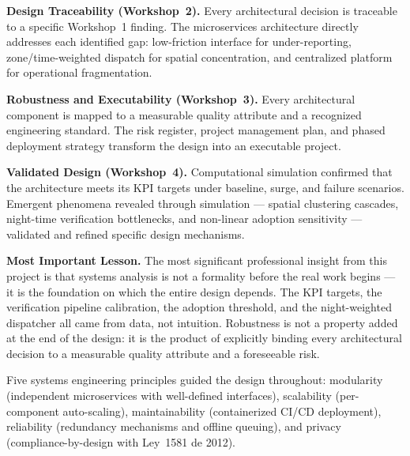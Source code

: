 \documentclass[11pt,a4paper]{article}
\begin{document}
\textbf{Design Traceability (Workshop~2).} Every architectural decision is traceable to a specific Workshop~1 finding. The microservices architecture directly addresses each identified gap: low-friction interface for under-reporting, zone/time-weighted dispatch for spatial concentration, and centralized platform for operational fragmentation.

\textbf{Robustness and Executability (Workshop~3).} Every architectural component is mapped to a measurable quality attribute and a recognized engineering standard. The risk register, project management plan, and phased deployment strategy transform the design into an executable project.

\textbf{Validated Design (Workshop~4).} Computational simulation confirmed that the architecture meets its KPI targets under baseline, surge, and failure scenarios. Emergent phenomena revealed through simulation --- spatial clustering cascades, night-time verification bottlenecks, and non-linear adoption sensitivity --- validated and refined specific design mechanisms.

\textbf{Most Important Lesson.} The most significant professional insight from this project is that systems analysis is not a formality before the real work begins --- it is the foundation on which the entire design depends. The KPI targets, the verification pipeline calibration, the adoption threshold, and the night-weighted dispatcher all came from data, not intuition. Robustness is not a property added at the end of the design: it is the product of explicitly binding every architectural decision to a measurable quality attribute and a foreseeable risk.

Five systems engineering principles guided the design throughout: modularity (independent microservices with well-defined interfaces), scalability (per-component auto-scaling), maintainability (containerized CI/CD deployment), reliability (redundancy mechanisms and offline queuing), and privacy (compliance-by-design with Ley~1581 de 2012).
\end{document}
